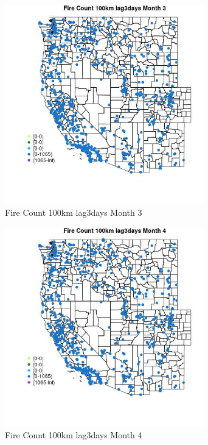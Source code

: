 \begin{figure} 
\centering  
\includegraphics[width=0.77\textwidth]{Code_Outputs/Report_ML_input_PM25_Step4_part_f_de_duplicated_aveswNAs_MapObsMo3Fire_Count_100km_lag3days.jpg} 
\caption{\label{fig:Report_ML_input_PM25_Step4_part_f_de_duplicated_aveswNAsMapObsMo3Fire_Count_100km_lag3days}Fire Count 100km lag3days Month 3} 
\end{figure} 
 

\begin{figure} 
\centering  
\includegraphics[width=0.77\textwidth]{Code_Outputs/Report_ML_input_PM25_Step4_part_f_de_duplicated_aveswNAs_MapObsMo4Fire_Count_100km_lag3days.jpg} 
\caption{\label{fig:Report_ML_input_PM25_Step4_part_f_de_duplicated_aveswNAsMapObsMo4Fire_Count_100km_lag3days}Fire Count 100km lag3days Month 4} 
\end{figure} 
 

